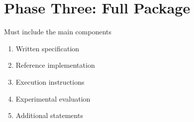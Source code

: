 \section{Phase Three: Full Package}

Must include the main components

\begin{enumerate}
  \item Written specification
  \item Reference implementation
  \item Execution instructions
  \item Experimental evaluation
  \item Additional statements
\end{enumerate}
